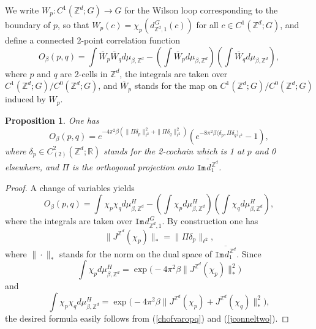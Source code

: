 \documentclass[11pt,reqno]{amsart}
\numberwithin{equation}{section}
\newtheorem{proposition}[theorem]{Proposition}
\theoremstyle{remark}
\theoremstyle{rmdefinition}
\begin{document}
We write 
$W_p:C^1(\mathbb{Z}^d;G) \to G$
for the Wilson loop corresponding to the boundary of $p$, so that 
$W_p(c)= \chi_p(d_{\mathbb{Z}^d,1}^{\hspace{1pt}G}(c))$ for all $c \in C^1(\mathbb{Z}^d;G)$, and  define a connected 2-point correlation function
\begin{equation}
	O_{\beta}(p,q)=\int \overline{W}_p \overline{W}_q d\mu_{\beta, \mathbb{Z}^d} - \left(\int\overline{W}_p d\mu_{\beta, \mathbb{Z}^d}\right)\left(\int\overline{W}_q d\mu_{\beta, \mathbb{Z}^d}\right),
\end{equation}
where $p$ and $q$ are 2-cells in $\mathbb{Z}^d$, the integrals are taken over $C^1(\mathbb{Z}^d;G) /C^0(\mathbb{Z}^d;G)$, and $\overline{W}_p$ stands for the map on $C^1(\mathbb{Z}^d;G) /C^0(\mathbb{Z}^d;G)$ induced by $W_p$.
\begin{proposition}\label{propoofsq} One has
	$$ O_{\beta}(p,q)=e^{-4\pi^2\beta(\|\Pi \delta_p \|^2_{\ell^2}+\|\Pi \delta_q \|^2_{\ell^2})}\left(e^{-8\pi^2\beta\langle  \delta_p,\Pi \delta_q \rangle_{\ell^2}} -1\right),$$
		where $\delta_p \in C^{2}_{(2)}(\mathbb{Z}^d;\mathbb R)$ stands for the 2-cochain which is 1 at $p$ and 0 elsewhere, and $\Pi$ is the orthogonal projection onto $\overline{\mathtt{Im} \hspace{1pt} d_1^{\hspace{1pt}\mathbb{Z}^d}}$.
\end{proposition}
\begin{proof}
A change of variables yields
\begin{equation}\label{chofvaropq}
	O_{\beta}(p,q)=\int \chi_p \chi_q d\mu^H_{\beta,\mathbb{Z}^d} - \left(\int \chi_p d\mu^H_{\beta,\mathbb{Z}^d}\right)\left(\int  \chi_q d\mu^H_{\beta,\mathbb{Z}^d}\right),
\end{equation}
where the integrals are taken over $\mathtt{Im}\hspace{1pt}d_{\mathbb{Z}^d,1}^{\hspace{1pt}G}$. By construction one has 
\begin{equation}\label{jconneltwo}
\| J^{\mathbb{Z}^d}(\chi_p) \|_{*}= \| \Pi \delta_p \| _{\ell^2},\end{equation}
where $\| \cdot \|_{*}$ stands for the norm on the dual space of $\overline{\mathtt{Im} \hspace{1pt} d_1^{\hspace{1pt}\mathbb{Z}^d}}$. Since
$$ \int \chi_p d\mu^H_{\beta,\mathbb{Z}^d}=\exp\big(-4\pi^{2}\beta \|J^{\mathbb{Z}^d}(\chi_p)\|_{*}^{2}\big) $$
and
$$ \int \chi_p \chi_q d\mu^H_{\beta,\mathbb{Z}^d}=
\exp\big(-4\pi^{2}\beta 
\|J^{\mathbb{Z}^d}(\chi_p)+J^{\mathbb{Z}^d}(\chi_q)\|_{*}^{2}\big),$$
the desired formula easily follows from (\ref{chofvaropq}) and (\ref{jconneltwo}).
\end{proof}
\end{document}
